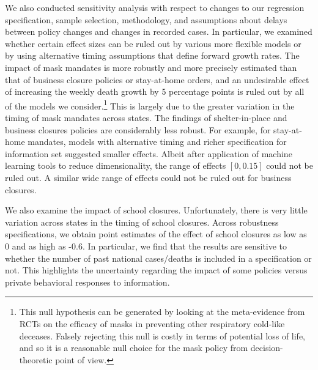 \documentclass[3p, longtitle]{elsarticle}
\theoremstyle{definition}
\begin{document}
We also conducted sensitivity analysis with respect to changes to our regression specification, sample selection, methodology, and assumptions about delays between policy changes and changes in recorded cases. In particular, we examined whether certain effect
sizes can be ruled out by various more flexible models or by using alternative timing assumptions
that define forward growth rates. The impact of mask mandates is more robustly and more precisely estimated than that of business closure policies or stay-at-home orders, and an undesirable effect of increasing the weekly death growth by 5 percentage points is ruled out by all of the  models we consider.\footnote{This null
hypothesis can be generated by looking at the meta-evidence from RCTs on the efficacy of masks in preventing other respiratory
cold-like deceases. Falsely rejecting this null is   costly in terms of potential loss of life, and so it is a reasonable null choice
for the mask policy from decision-theoretic point of view.} This is largely due to the greater variation in the timing of mask mandates across states. The findings of shelter-in-place and business closures policies are considerably less robust. For example, for stay-at-home mandates, models with alternative timing and richer specification for information set suggested smaller effects. Albeit
after application of machine learning tools to reduce dimensionality, the range of effects $[0,0.15]$ could not be ruled out.  A similar
wide range of effects could  not be ruled out for business closures.

We also examine the impact of school closures. Unfortunately, there is
very little variation across states in the timing of
school closures.  Across robustness specifications, we obtain point
estimates of the effect of school closures as low as 0 and as high as
-0.6. In particular, we find that the results are sensitive to whether
the number of past national cases/deaths is included in a
specification or not. This highlights the uncertainty regarding the
impact of some policies versus private behavioral responses to
information. %
\end{document}
